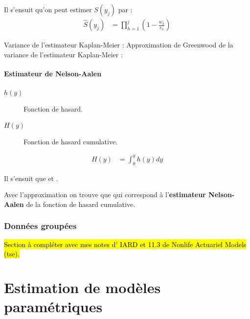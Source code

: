 \documentclass[10pt, french]{article}
\begin{document}
\begin{multicols*}{2}
Il s'ensuit qu'on peut estimer $S(y_{j})$ par :
\begin{align*}
	\hat{S}(y_{j})
	&=	\prod_{h = 1}^{j} \left(1 - \frac{w_{h}}{r_{h}}\right)
\end{align*}

Variance de l'estimateur Kaplan-Meier :  
Approximation de Greenwood de la variance de l'estimateur Kaplan-Meier :  


\paragraph{Estimateur de Nelson-Aalen}
\begin{distributions}[Notation]
\begin{description}
	\item[$h(y)$]	Fonction de hasard.
	\item[$H(y)$]	Fonction de hasard cumulative.
\end{description}
\end{distributions} 

\begin{align*}
	H(y)
	&=	\int_{0}^{y} h(y) dy
\end{align*}

Il s'ensuit que  et .

Avec l'approximation  on trouve que  qui correspond à l'\textbf{estimateur Nelson-Aalen} de la fonction de hasard cumulative.



\columnbreak
\subsubsection{Données groupées}
\hl{Section à compléter avec mes notes d’ IARD et 11.3 de Nonlife Actuariel Models (tse).}



\pagebreak
\section{Estimation de modèles paramétriques}\label{sec:paramModelEstimLikelihood}

\end{multicols*}
\end{document}
